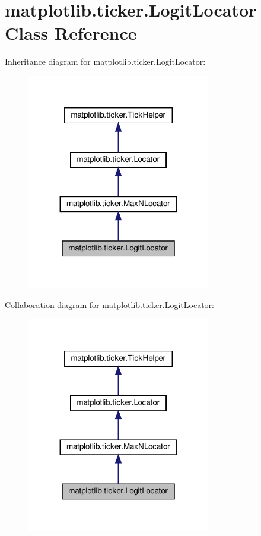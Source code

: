 \hypertarget{classmatplotlib_1_1ticker_1_1LogitLocator}{}\section{matplotlib.\+ticker.\+Logit\+Locator Class Reference}
\label{classmatplotlib_1_1ticker_1_1LogitLocator}


Inheritance diagram for matplotlib.\+ticker.\+Logit\+Locator\+:
\nopagebreak
\begin{figure}[H]
\begin{center}
\leavevmode
\includegraphics[width=227pt]{classmatplotlib_1_1ticker_1_1LogitLocator__inherit__graph}
\end{center}
\end{figure}


Collaboration diagram for matplotlib.\+ticker.\+Logit\+Locator\+:
\nopagebreak
\begin{figure}[H]
\begin{center}
\leavevmode
\includegraphics[width=227pt]{classmatplotlib_1_1ticker_1_1LogitLocator__coll__graph}
\end{center}
\end{figure}
